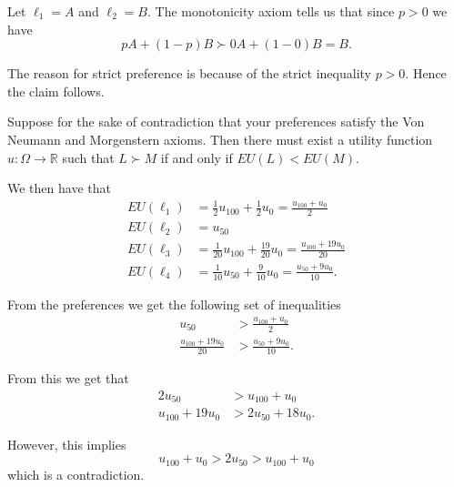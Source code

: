 \documentclass[a4paper]{article}
\begin{document}
  \begin{exercise}{4}
    Let $ \ell_1 = A $ and $ \ell_2 = B $. The monotonicity axiom tells us that since $ p > 0 $ we have
    \begin{equation*}
       pA + (1-p)B \succ 0A + (1- 0)B = B
    .\end{equation*}

    The reason for strict preference is because of the strict inequality $ p> 0 $. Hence the claim follows.
  \end{exercise}

  \begin{exercise}{5}
    Suppose for the sake of contradiction that your preferences satisfy the Von Neumann and Morgenstern axioms. Then there must exist a utility function $ u: \Omega \to \mathbb{R} $ such that $ L \succ M $ if and only if $ EU(L) < EU(M) $.

    We then have that
    \begin{align*}
      EU(\ell_1) &= \frac{1}{2}u_{100} + \frac{1}{2}u_0 = \frac{u_{100}+u_0}{2} \\
      EU(\ell_2) &= u_{50} \\
      EU(\ell_3) &= \frac{1}{20}u_{100} + \frac{19}{20}u_0 = \frac{u_{100} + 19u_0}{20} \\
      EU(\ell_4) &= \frac{1}{10}u_{50} + \frac{9}{10}u_0 = \frac{u_{50} + 9u_{0}}{10}
    .\end{align*}

    From the preferences we get the following set of inequalities
    \begin{align*}
      u_{50} &> \frac{u_{100} + u_0}{2} \\
      \frac{u_{100} + 19u_0}{20} &> \frac{u_{50} + 9u_0}{10}
    .\end{align*}

    From this we get that
    \begin{align*}
      2u_{50} &> u_{100} + u_0 \\
      u_{100} + 19u_0 &> 2u_{50} + 18u_0
    .\end{align*}

    However, this implies
    \begin{equation*}
    u_{100} + u_0 > 2u_{50} > u_{100} + u_0
    \end{equation*}
    which is a contradiction.
  \end{exercise}
\end{document}
